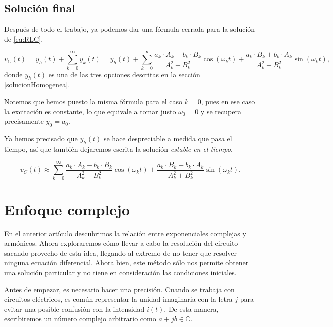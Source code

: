 \subsection{Solución final}
Después de todo el trabajo, ya podemos dar una fórmula cerrada para la solución de \eqref{eq:RLC}.
\begin{mybox} \vspace{-4mm}
  \begin{equation}
    \label{eq:SolucionRLC}
    v_C(t) = y_h(t) + \sum _{k=0}^{\infty} y_k (t) = y_h(t) +  \sum _{k=0}^{\infty}  \frac{a_k\cdot A_k-b_k\cdot B_k}{A_k^2+B_k^2}\cos(\omega_kt) + \frac{a_k\cdot B_k + b_k\cdot A_k}{A_k^2+B_k^2}\sin(\omega_kt),
  \end{equation}
  donde $y_h(t)$ es una de las tres opciones descritas en la sección \ref{solucionHomogenea}.
\end{mybox}

Notemos que hemos puesto la misma fórmula para el caso $k=0$, pues en ese caso la excitación es constante, lo que equivale a tomar justo $\omega_0=0$ y se recupera precisamente $y_0=a_0$.

Ya hemos precisado que $y_h(t)$ se hace despreciable a medida que pasa el tiempo, así que también dejaremos escrita la solución \textit{estable en el tiempo}.

\begin{mybox} \vspace{-4mm}
  \begin{equation}
    \label{eq:SolucionRLC2}
    v_C(t) \approx \sum _{k=0}^{\infty}  \frac{a_k\cdot A_k-b_k\cdot B_k}{A_k^2+B_k^2}\cos(\omega_kt) + \frac{a_k\cdot B_k + b_k\cdot A_k}{A_k^2+B_k^2}\sin(\omega_kt).
  \end{equation}
\end{mybox}


\section{Enfoque complejo}

En el anterior artículo descubrimos la relación entre exponenciales complejas y armónicos. Ahora exploraremos cómo llevar a cabo la resolución del circuito sacando provecho de esta idea, llegando al extremo de no tener que resolver ninguna ecuación diferencial. Ahora bien, este método sólo nos permite obtener una solución particular y no tiene en consideración las condiciones iniciales.

Antes de empezar, es necesario hacer una precisión. Cuando se trabaja con circuitos eléctricos, es común representar la unidad imaginaria con la letra $j$ para evitar una posible confusión con la intensidad $i(t)$. De esta manera, escribiremos un número complejo arbitrario como $a+jb\in\mathbb{C}$.

